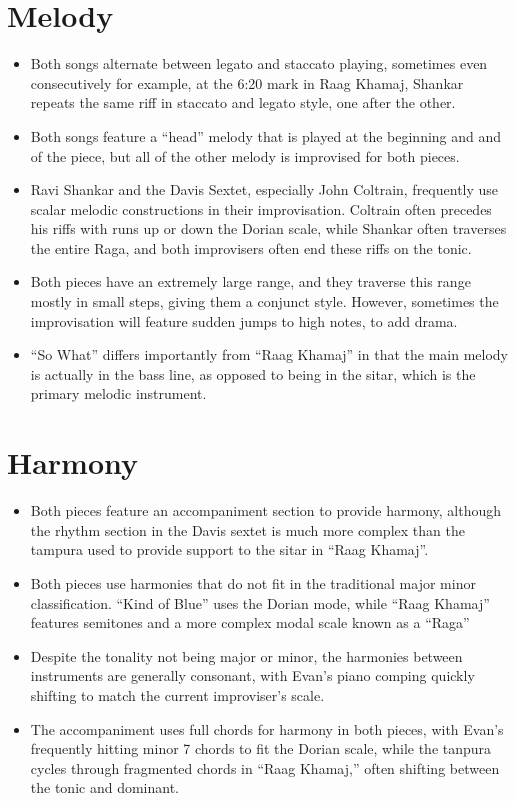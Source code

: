 \documentclass[12pt]{article}
\begin{document}
\section*{Melody}
\begin{itemize}
\item Both songs alternate between legato and staccato playing, sometimes even
  consecutively for example, at the 6:20 mark in Raag Khamaj, Shankar repeats
  the same riff in staccato and legato style, one after the other. 
\item Both songs feature a ``head'' melody that is played at the beginning and
  and of the piece, but all of the other melody is improvised for both pieces.   
\item Ravi Shankar and the Davis Sextet, especially John Coltrain, frequently
  use scalar melodic constructions in their improvisation. Coltrain often
  precedes his riffs with runs up or down the Dorian scale, while Shankar often
  traverses the entire Raga, and both improvisers often end these riffs on the
  tonic. 
\item Both pieces have an extremely large range, and they traverse this range
  mostly in small steps, giving them a conjunct style. However, sometimes the
  improvisation will feature sudden jumps to high notes, to add drama. 
\item ``So What'' differs importantly from ``Raag Khamaj'' in that the main
  melody is actually in the bass line, as opposed to being in the sitar, which
  is the primary melodic instrument. 
\end{itemize}
\section*{Harmony}
\begin{itemize}
\item Both pieces feature an accompaniment section to provide harmony, although
  the rhythm section in the Davis sextet is much more complex than the tampura
  used to provide support to the sitar in ``Raag Khamaj''. 
\item Both pieces use harmonies that do not fit in the traditional major minor
  classification. ``Kind of Blue'' uses the Dorian mode, while ``Raag Khamaj''
  features semitones and a more complex modal scale known as a ``Raga''
\item Despite the tonality not being major or minor, the harmonies between
  instruments are generally consonant, with Evan's piano comping quickly
  shifting to match the current improviser's scale.
\item The accompaniment uses full chords for harmony in both pieces, with Evan's
  frequently hitting minor 7 chords to fit the Dorian scale, while the tanpura
  cycles through fragmented chords in ``Raag Khamaj,'' often shifting between
  the tonic and dominant.
\end{itemize}
\end{document}
